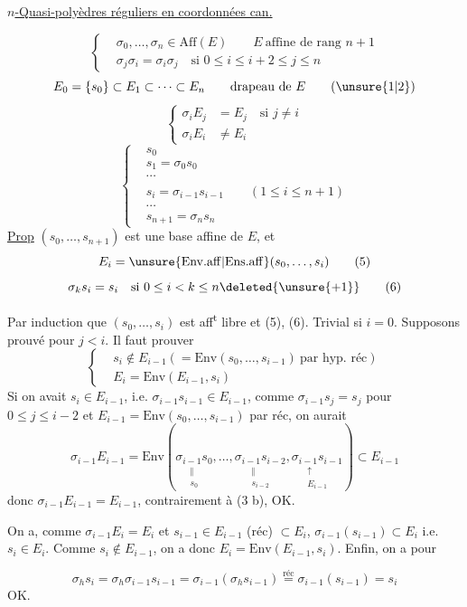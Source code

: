 \uline{$n$-Quasi-polyèdres réguliers en coordonnées can.}

\[
\left\{\begin{aligned}
&\sigma_0,\ldots,\sigma_n\in\mathrm{Aff}(E)\qquad E\ \text{affine de rang }n+1\\
&\sigma_j\sigma_i=\sigma_i\sigma_j\quad\text{si }0\leq i\leq i+2\leq j\leq n
\end{aligned}\right.\tag*{(1)}
\]
\[
E_0=\{s_0\}\subset E_1\subset\cdots\subset E_n\qquad\text{drapeau de }E\tag*{(\unsure{1|2})}
\]
\[
\left\{\begin{aligned}
\sigma_iE_j&=E_j\quad\text{si }j\ne i\\
\sigma_iE_i&\ne E_i
\end{aligned}\right.\tag*{(3)}
\]
\[
\left\{\begin{aligned}
&s_0\\
&s_1=\sigma_0s_0\\
&\cdots\\
&s_i=\sigma_{i-1}s_{i-1}\qquad(1\leq i\leq n+1)\\
&\cdots\\
&s_{n+1}=\sigma_ns_n
\end{aligned}\right.\tag*{(4)}
\]
\uline{Prop} $(s_0,\ldots,s_{n+1})$ est une base affine de $E$, et
\[
E_i=\unsure{\mathrm{Env.aff}|\mathrm{Ens.aff}}(s_0,\ldots,s_i)\tag*{(5)}
\]
\[
\sigma_ks_i=s_i\quad\text{si }0\leq i<k\leq n\deleted{\unsure{+1}}\tag*{(6)}
\]

Par induction  que $(s_0,\ldots,s_i)$ est aff\textsuperscript{t} libre et (5), (6). Trivial si $i=0$. Supposons  prouvé pour $j<i$. Il faut prouver
\[
\left\{\begin{aligned}
&s_i\notin E_{i-1}(=\mathrm{Env}(s_0,\ldots,s_{i-1})\ \text{par hyp. réc})\\
&E_i=\mathrm{Env}(E_{i-1},s_i)
\end{aligned}\right.
\]
Si on avait $s_i\in E_{i-1}$, i.e. $\sigma_{i-1}s_{i-1}\in E_{i-1}$, comme $\sigma_{i-1}s_j=s_j$ pour $0\leq j\leq i-2$ et $E_{i-1}=\mathrm{Env}(s_0,\ldots,s_{i-1})$ par réc, on aurait
\[
\sigma_{i-1}E_{i-1}=\mathrm{Env}(\underset{\substack{\Vert\\s_0}}{\sigma_{i-1}s_0},\ldots,\underset{\substack{\Vert\\s_{i-2}}}{\sigma_{i-1}s_{i-2}},\underset{\substack{\uparrow\\E_{i-1}}}{\sigma_{i-1}s_{i-1}})\subset E_{i-1}
\]
donc $\sigma_{i-1}E_{i-1}=E_{i-1}$, contrairement à (3 b), OK.

On a, comme $\sigma_{i-1}E_i=E_i$ et $s_{i-1}\in E_{i-1}$ (réc) $\subset E_i$, $\sigma_{i-1}(s_{i-1})\subset E_i$ i.e. $s_i\in E_i$. Comme $s_i\notin E_{i-1}$, on a donc $E_i=\mathrm{Env}(E_{i-1},s_i)$. Enfin, on a pour 

\[
\sigma_hs_i=\sigma_h\sigma_{i-1}s_{i-1}=\sigma_{i-1}(\sigma_hs_{i-1})\overset{\text{réc}}{=}\sigma_{i-1}(s_{i-1})=s_i
\]
OK.
